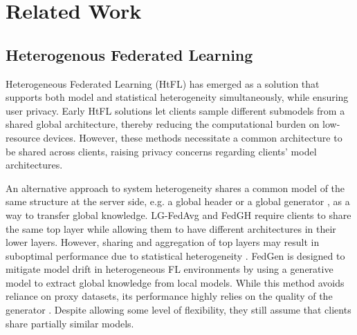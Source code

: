 \section{Related Work}
\label{sec:related work}

\subsection{Heterogenous Federated Learning}

Heterogeneous Federated Learning (HtFL) has emerged as a solution that supports both model and statistical heterogeneity simultaneously, while ensuring user privacy.
Early HtFL solutions \cite{diao2020heterofl, horvath2021fjord, wen2022federated} let clients sample different submodels from a shared global architecture, thereby reducing the computational burden on low-resource devices. However, these methods necessitate a common architecture to be shared across clients, raising privacy concerns regarding clients’ model architectures.

An alternative approach to system heterogeneity shares a common model of the same structure at the server side, e.g. a global header \cite{yi2023fedgh} or a global generator \cite{FedGen}, as a way to transfer global knowledge. LG-FedAvg \cite{lgfedavg} and FedGH \cite{yi2023fedgh} require clients to share the same top layer while allowing them to have different architectures in their lower layers. However, sharing and aggregation of top layers may result in suboptimal performance due to statistical heterogeneity \cite{nofearofclassifierbiases, nofearofheterogenity}. FedGen \cite{FedGen} is designed to mitigate model drift in heterogeneous FL environments by using a generative model to extract global knowledge from local models. While this method avoids reliance on proxy datasets, its performance highly relies on the quality of the generator \cite{fedtgp}. Despite allowing some level of flexibility, they still assume that clients share partially similar models. 

